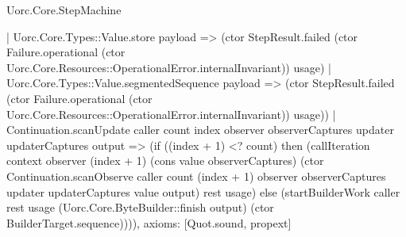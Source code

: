 \begin{lexlean}{Uorc.Core.StepMachine}
\begin{semanticmodule}
{      | Uorc.Core.Types::Value.store payload => (ctor StepResult.failed (ctor Failure.operational (ctor Uorc.Core.Resources::OperationalError.internalInvariant)) usage)
      | Uorc.Core.Types::Value.segmentedSequence payload => (ctor StepResult.failed (ctor Failure.operational (ctor Uorc.Core.Resources::OperationalError.internalInvariant)) usage))
    | Continuation.scanUpdate caller count index observer observerCaptures updater updaterCaptures output => (if ((index + 1) <? count) then (callIteration context observer (index + 1) (cons value observerCaptures) (ctor Continuation.scanObserve caller count (index + 1) observer observerCaptures updater updaterCaptures value output) rest usage) else (startBuilderWork caller rest usage (Uorc.Core.ByteBuilder::finish output) (ctor BuilderTarget.sequence)))),
  axioms: [Quot.sound, propext]
}


\end{semanticmodule}
\end{lexlean}
